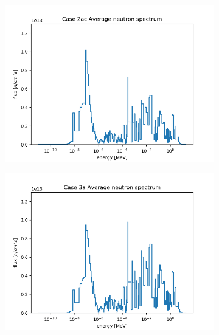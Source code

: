 \documentclass[letterpaper,11pt]{report}
\begin{document}
\begin{figure}[H]
\begin{subfigure}{.33\textwidth}
                \caption{}
              \end{subfigure}
              \begin{subfigure}{.33\textwidth}
                \centering
                \includegraphics[width=\linewidth]{../../phase1a/case2ac/analysis_output/p1a_2ac_f.png}
                \caption{}
              \end{subfigure}
              \begin{subfigure}{.33\textwidth}
                \centering
                \includegraphics[width=\linewidth]{../../phase1a/case3a/analysis_output/p1a_3a_f.png}
                \caption{}
              \end{subfigure}
              \begin{subfigure}{.33\textwidth}

\end{subfigure}
\end{figure}
\end{document}

